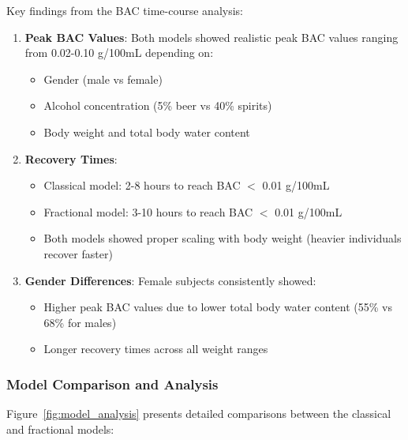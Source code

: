 \documentclass[11pt]{article}
\begin{document}
Key findings from the BAC time-course analysis:

\begin{enumerate}
    \item \textbf{Peak BAC Values}: Both models showed realistic peak BAC values ranging from 0.02-0.10 g/100mL depending on:
    \begin{itemize}
        \item Gender (male vs female)
        \item Alcohol concentration (5\% beer vs 40\% spirits)
        \item Body weight and total body water content
    \end{itemize}
    
    \item \textbf{Recovery Times}: 
    \begin{itemize}
        \item Classical model: 2-8 hours to reach BAC $<$ 0.01 g/100mL
        \item Fractional model: 3-10 hours to reach BAC $<$ 0.01 g/100mL
        \item Both models showed proper scaling with body weight (heavier individuals recover faster)
    \end{itemize}
    
    \item \textbf{Gender Differences}: Female subjects consistently showed:
    \begin{itemize}
        \item Higher peak BAC values due to lower total body water content (55\% vs 68\% for males)
        \item Longer recovery times across all weight ranges
    \end{itemize}
\end{enumerate}

\subsubsection{Model Comparison and Analysis}

Figure~\ref{fig:model_analysis} presents detailed comparisons between the classical and fractional models:
\end{document}
